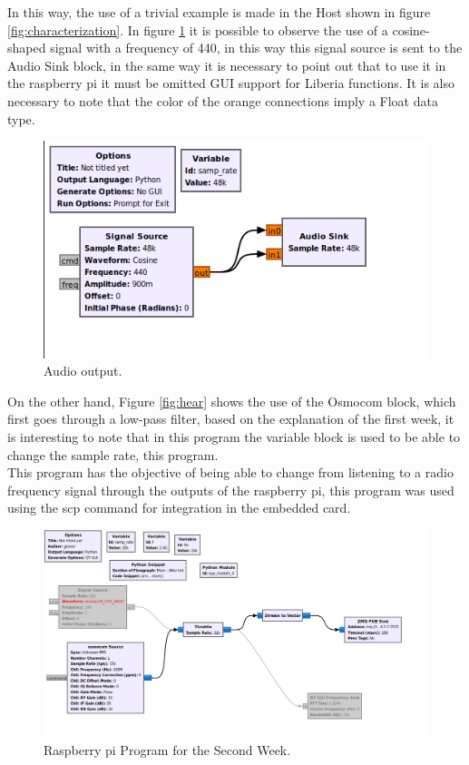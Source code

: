 \documentclass[12pt, twoside]{report}
\begin{document}
In this way, the use of a trivial example is made in the Host shown in figure \ref{fig:characterization}.
In figure \ref{fig:firstsecond} it is possible to observe the use of a cosine-shaped signal with a frequency of 440, in this way this signal source is sent to the Audio Sink block, in the same way it is necessary to point out that to use it in the raspberry pi it must be omitted GUI support for Liberia functions. It is also necessary to note that the color of the orange connections imply a Float data type.\\
\begin{figure}[!h]
\centering
  \includegraphics[width=\linewidth]{images/Program_1a.png}
  \caption{Audio output.}
  \label{fig:firstsecond}
\end{figure}
On the other hand, Figure \ref{fig:hear} shows the use of the Osmocom block, which first goes through a low-pass filter, based on the explanation of the first week, it is interesting to note that in this program the variable block is used to be able to change the sample rate, this program.\\
This program has the objective of being able to change from listening to a radio frequency signal through the outputs of the raspberry pi, this program was used using the scp command for integration in the embedded card.\\
\begin{figure}[!h]
\centering
  \includegraphics[width=\linewidth]{images/RPI_2WEEK.png}
  \caption{Raspberry pi Program for the Second Week.}
  \label{fig:RPISECONDWEEK}
\end{figure}
\end{document}
